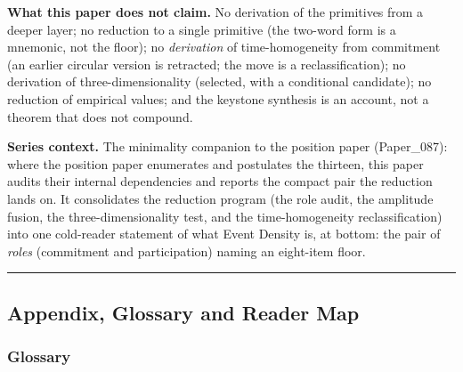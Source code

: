\documentclass[
  11pt,
]{article}
\begin{document}
\textbf{What this paper does not claim.} No derivation of the primitives
from a deeper layer; no reduction to a single primitive (the two-word
form is a mnemonic, not the floor); no \emph{derivation} of
time-homogeneity from commitment (an earlier circular version is
retracted; the move is a reclassification); no derivation of
three-dimensionality (selected, with a conditional candidate); no
reduction of empirical values; and the keystone synthesis is an account,
not a theorem that does not compound.

\textbf{Series context.} The minimality companion to the position paper
(Paper\_087): where the position paper enumerates and postulates the
thirteen, this paper audits their internal dependencies and reports the
compact pair the reduction lands on. It consolidates the reduction
program (the role audit, the amplitude fusion, the three-dimensionality
test, and the time-homogeneity reclassification) into one cold-reader
statement of what Event Density is, at bottom: the pair of \emph{roles}
(commitment and participation) naming an eight-item floor.

\begin{center}\rule{0.5\linewidth}{0.5pt}\end{center}

\subsection{Appendix, Glossary and Reader
Map}\label{appendix-glossary-and-reader-map}

\subsubsection{Glossary}\label{glossary}
\end{document}
